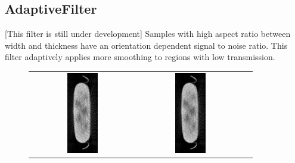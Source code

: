 \documentclass[a4paper]{scrreprt}
\begin{document}
\subsection{AdaptiveFilter}
[This filter is still under development] Samples with high aspect ratio between width and thickness have an orientation dependent signal to noise ratio\cite{kachelriess2001_filter}. This filter adaptively applies more smoothing to regions with low transmission.
\begin{figure}[ht!]
\centering
\begin{tabular}{ccc}
\includegraphics[angle=90, width=0.3\textwidth]{figures/adaptive_raw.png} &
\includegraphics[angle=90, width=0.3\textwidth]{figures/adaptive_filtered.png} &

\end{tabular}
\end{figure}
\end{document}
